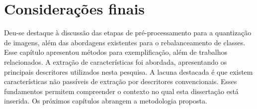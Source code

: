 \section{Considerações finais}

Deu-se destaque à discussão das etapas de pré-processamento para a quantização de imagens, além das abordagens existentes para o rebalanceamento de classes. Esse capítulo apresentou métodos para exemplificação, além de trabalhos relacionados. A extração de características foi abordada, apresentando os principais descritores utilizados nesta pesquisa. A lacuna destacada é que existem características não passíveis de extração por descritores convencionais. Esses fundamentos permitem compreender o contexto no qual esta dissertação está inserida. Os próximos capítulos abrangem a metodologia proposta.

